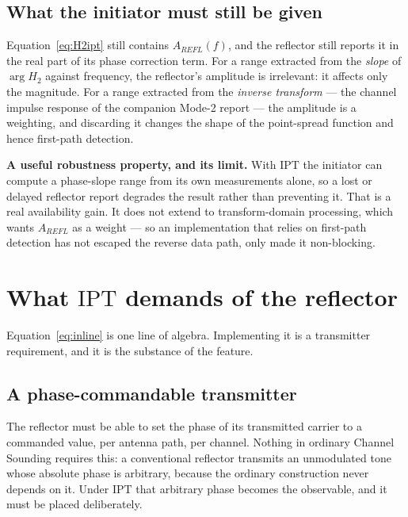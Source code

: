 \documentclass[11pt,a4paper]{article}
\newcommand{\IPT}{\ensuremath{\mathrm{IPT}}}
\begin{document}
\subsection{What the initiator must still be given}

Equation~\eqref{eq:H2ipt} still contains $A_{REFL}(f)$, and the reflector still reports it in the
real part of its phase correction term. For a range extracted from the \emph{slope} of
$\arg H_2$ against frequency, the reflector's amplitude is irrelevant: it affects only the magnitude.
For a range extracted from the \emph{inverse transform} --- the channel impulse response of the
companion Mode-2 report --- the amplitude is a weighting, and discarding it changes the shape of the
point-spread function and hence first-path detection.

\begin{callout}
\textbf{A useful robustness property, and its limit.} With \IPT{} the initiator can compute a
phase-slope range from its own measurements alone, so a lost or delayed reflector report degrades the
result rather than preventing it. That is a real availability gain. It does not extend to
transform-domain processing, which wants $A_{REFL}$ as a weight --- so an implementation that relies
on first-path detection has not escaped the reverse data path, only made it non-blocking.
\end{callout}
\section{What \IPT{} demands of the reflector}
\label{sec:reflector}

Equation~\eqref{eq:inline} is one line of algebra. Implementing it is a transmitter requirement, and
it is the substance of the feature.

\subsection{A phase-commandable transmitter}

The reflector must be able to set the phase of its transmitted carrier to a commanded value, per
antenna path, per channel. Nothing in ordinary Channel Sounding requires this: a conventional
reflector transmits an unmodulated tone whose absolute phase is arbitrary, because the ordinary
construction never depends on it. Under \IPT{} that arbitrary phase becomes the observable, and it
must be placed deliberately.
\end{document}
